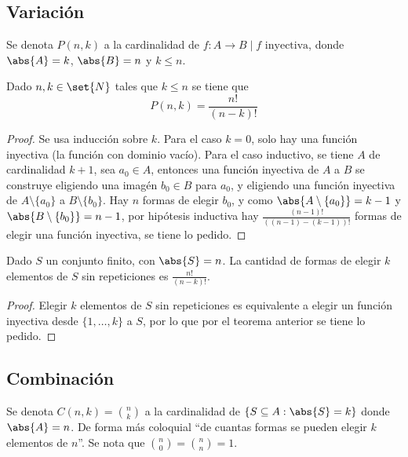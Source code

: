 \documentclass{ayudantia}
\begin{document}
\subsection{Variación}
\begin{defn}[Variación]
    Se denota \(P(n,k)\) a la cardinalidad de \(f:A\rightarrow B\mid f\text{ inyectiva}\), donde \(\abs{A}=k\), \(\abs{B}=n\) y \(k\leq n\).
\end{defn}
\begin{thm}
    Dado \(n,k\in\set{N}\) tales que \(k\leq n\) se tiene que
    \begin{equation*}
        P(n,k)=\frac{n!}{(n-k)!}
    \end{equation*}
\end{thm}
\begin{proof}
    Se usa inducción sobre \(k\). Para el caso \(k=0\), solo hay una función inyectiva (la función con dominio vacío). Para el caso inductivo, se tiene \(A\) de cardinalidad \(k+1\), sea \(a_0\in A\), entonces una función inyectiva de \(A\) a \(B\) se construye eligiendo una imagén \(b_0\in B\) para \(a_0\), y eligiendo una función inyectiva de \(A\setminus\{a_0\}\) a \(B\setminus\{b_0\}\). Hay \(n\) formas de elegir \(b_0\), y como \(\abs{A\setminus\{a_0\}}=k-1\) y \(\abs{B\setminus\{b_0\}}=n-1\), por hipótesis inductiva hay \(\frac{(n-1)!}{((n-1)-(k-1))!}\) formas de elegir una función inyectiva, se tiene lo pedido.
\end{proof}

\begin{cor}
    Dado \(S\) un conjunto finito, con \(\abs{S}=n\). La cantidad de formas de elegir \(k\) elementos de \(S\) sin repeticiones es \(\frac{n!}{(n-k)!}\).
\end{cor}
\begin{proof}
    Elegir \(k\) elementos de \(S\) sin repeticiones es equivalente a elegir un función inyectiva desde \(\{1,\ldots,k\}\) a \(S\), por lo que por el teorema anterior se tiene lo pedido.
\end{proof}

\subsection{Combinación}
\begin{defn}[Combinación]
    Se denota \(C(n,k)=\binom{n}{k}\) a la cardinalidad de \(\{S\subseteq A:\abs{S}=k\}\) donde \(\abs{A}=n\). De forma más coloquial ``de cuantas formas se pueden elegir \(k\) elementos de \(n\)''. Se nota que \(\binom{n}{0}=\binom{n}{n}=1\).
\end{defn}
\end{document}
